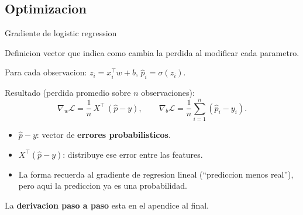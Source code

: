 \subsection{Optimizacion}

\begin{frame}{Gradiente de logistic regression}
\begin{block}{Definicion}
\small
{} vector que indica como cambia la perdida al modificar cada parametro.
\end{block}

\vspace{0.2em}
Para cada observacion: $z_i = x_i^\top w + b$, $\hat p_i = \sigma(z_i)$.

\vspace{0.25em}
Resultado (perdida promedio sobre $n$ observaciones):
\[
\nabla_w \mathcal{L}
= \frac{1}{n}\,X^\top\,(\hat p - y),
\qquad
\nabla_b \mathcal{L}
= \frac{1}{n}\sum_{i=1}^n (\hat p_i - y_i).
\]

\vspace{0.25em}
\begin{itemize}\footnotesize
  \item $\hat p - y$: vector de \textbf{errores probabilisticos}.
  \item $X^\top(\hat p - y)$: distribuye ese error entre las features.
  \item La forma recuerda al gradiente de regresion lineal (``prediccion menos real''), pero aqui la prediccion ya es una probabilidad.
\end{itemize}

\vspace{0.15em}
{\footnotesize La \textbf{derivacion paso a paso} esta en el apendice al final.}
\end{frame}

